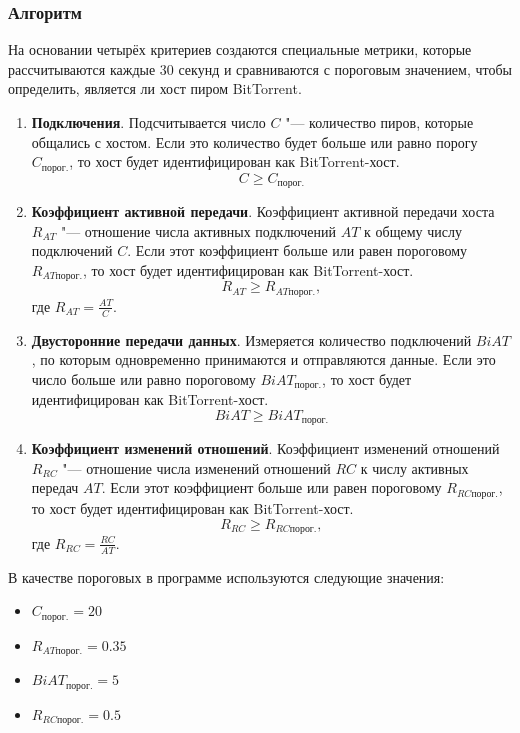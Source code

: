\documentclass[bachelor, och, coursework]{SCWorks}
\begin{document}
\subsubsection{Алгоритм}
На основании четырёх критериев создаются специальные метрики, которые рассчитываются каждые 30 секунд
и сравниваются с пороговым значением, чтобы определить, является ли хост пиром BitTorrent. 

\begin{enumerate}
    \item \textbf{Подключения}. Подсчитывается число $C$ "--- количество пиров, которые общались с хостом. Если это количество будет больше или равно порогу $C_{\text{порог.}}$, то хост будет идентифицирован как BitTorrent-хост.
    \[ C \geq C_{\text{порог.}} \]
    
    \item \textbf{Коэффициент активной передачи}. Коэффициент активной передачи хоста $R_{AT}$ "--- отношение числа активных подключений $AT$ к общему числу подключений $C$.
    Если этот коэффициент больше или равен пороговому $R_{AT\text{порог.}}$, то хост будет идентифицирован как BitTorrent-хост.
    \[ R_{AT} \geq R_{AT\text{порог.}}, \]
    где $R_{AT} = \frac{AT}{C}$.

    \item \textbf{Двусторонние передачи данных}. Измеряется количество подключений $BiAT$, по которым одновременно принимаются и отправляются данные. 
    Если это число больше или равно пороговому $BiAT_{\text{порог.}}$, то хост будет идентифицирован как BitTorrent-хост.
    \[ BiAT \geq BiAT_{\text{порог.}} \]

    \item \textbf{Коэффициент изменений отношений}. Коэффициент изменений отношений $R_{RC}$ "--- отношение числа изменений отношений $RC$ к числу активных передач $AT$.
    Если этот коэффициент больше или равен пороговому $R_{RC\text{порог.}}$, то хост будет идентифицирован как BitTorrent-хост.
    \[ R_{RC} \geq R_{RC\text{порог.}}, \]
    где $R_{RC} = \frac{RC}{AT}$.
\end{enumerate}

В качестве пороговых в программе используются следующие значения:
\begin{itemize}
    \item $C_{\text{порог.}} = 20$
    \item $R_{AT\text{порог.}} = 0.35$
    \item $BiAT_{\text{порог.}} = 5$
    \item $R_{RC\text{порог.}} = 0.5$
\end{itemize}
\end{document}
